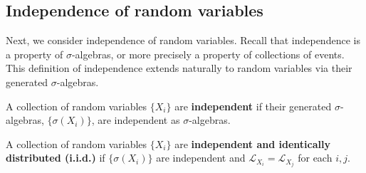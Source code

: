 \subsection{Independence of random variables}

Next, we consider independence of random variables. Recall that independence is a property of $\sigma$-algebras, or more precisely a property of collections of events. This definition of independence extends naturally to random variables via their generated $\sigma$-algebras. 

\begin{definition}
	A collection of random variables $\{X_i\}$ are \textbf{independent} if their generated $\sigma$-algebras, $\{\sigma(X_i)\}$, are independent as $\sigma$-algebras. 
\end{definition}

\begin{definition}
	A collection of random variables $\{X_i\}$ are \textbf{independent and identically distributed (i.i.d.)} if $\{\sigma(X_i)\}$ are independent and $\mathcal L_{X_i} = \mathcal L_{X_j}$ for each $i, j$. 
\end{definition}

